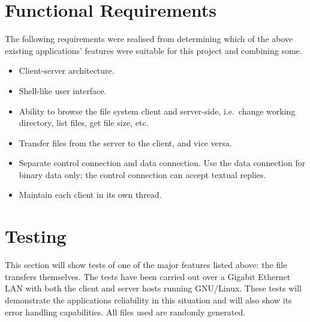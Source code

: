 \documentclass[a4paper]{article}
\begin{document}
\section{Functional Requirements}

The following requirements were realised from determining which of the above existing applications' features were suitable for this project and combining some.

\begin{itemize}
 \item Client-server architecture.
 \item Shell-like user interface.
 \item Ability to browse the file system client and server-side, i.e.\ change working directory, list files, get file size, etc.
 \item Transfer files from the server to the client, and vice versa.
 \item Separate control connection and data connection. Use the data connection for binary data only; the control connection can accept textual replies.
 \item Maintain each client in its own thread.
\end{itemize}


\section{Testing}

This section will show tests of one of the major features listed above: the file transfers themselves. The tests have been carried out over a Gigabit Ethernet LAN with both the client and server hosts running GNU/Linux. These tests will demonstrate the applications reliability in this situation and will also show its error handling capabilities. All files used are randomly generated.
\end{document}
